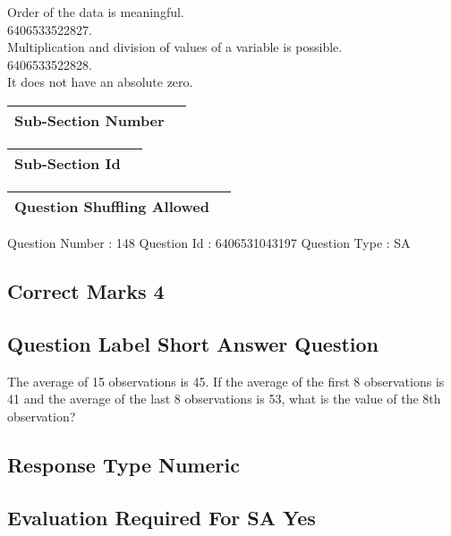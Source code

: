 \documentclass{article}
\begin{document}
Order of the data is meaningful.\\

6406533522827.\\

Multiplication and division of values of a variable is possible.\\

6406533522828.\\

It does not have an absolute zero.\\

\begin{longtable}{|c|c|}
\hline
\textbf{Sub-Section Number} & \textbf{} \\ \hline
\end{longtable}

\begin{longtable}{|c|c|}
\hline
\textbf{Sub-Section Id} & \textbf{} \\ \hline
\end{longtable}

\begin{longtable}{|c|c|}
\hline
\textbf{Question Shuffling Allowed} & \textbf{} \\ \hline
\end{longtable}

Question Number : 148 Question Id : 6406531043197 Question Type : SA\\

\subsection{Correct Marks  4}

\subsection{Question Label  Short Answer Question}

The average of 15 observations is 45. If the average of the first 8 observations is 41 and the 
average of the last 8 observations is 53, what is the value of the 8th observation?\\

\subsection{Response Type  Numeric}

\subsection{Evaluation Required For SA  Yes}
\end{document}
